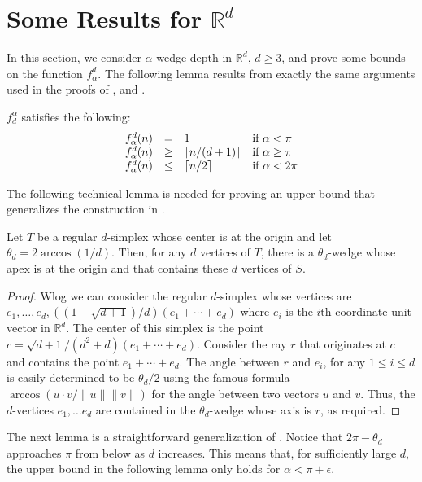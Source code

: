 \documentclass[lotsofwhite]{patmorin}
\newcommand{\blah}[1]{2\arccos(1/#1)}
\begin{document}
\section{Some Results for $\mathbb{R}^d$}

In this section, we consider $\alpha$-wedge depth in $\mathbb{R}^d$,
$d\ge 3$, and prove  some bounds on the function $f^d_\alpha$.  The
following lemma results from exactly the same arguments used in the
proofs of ,  and .

\begin{lem}
$f^\alpha_d$ satisfies the following:
\[\begin{array}{lcll}
  f^d_\alpha(n) & = & 1 & \mbox{if $\alpha < \pi$} \\
  f^d_\alpha(n) & \ge & \left\lceil n/(d+1) \right\rceil & \mbox{if $\alpha \ge \pi$} \\
  f^d_\alpha(n) & \le & \left\lceil n/2 \right\rceil & \mbox{if $\alpha < 2\pi$} \\
\end{array}\]
\end{lem}

The following technical lemma is needed for proving an upper bound
that generalizes the construction in .

\begin{lem}
Let $T$ be a regular $d$-simplex whose center is at the origin and let
$\theta_d=\blah{d}$.  Then, for any $d$ vertices of $T$, there is a
$\theta_d$-wedge whose apex is at the origin and that contains these
$d$ vertices of $S$.
\end{lem}

\begin{proof} 
Wlog we can consider the regular $d$-simplex whose vertices are
$e_1,\ldots,e_d, ((1-\sqrt{d+1})/d)(e_1+\cdots+e_d)$ where $e_i$ is the
$i$th coordinate unit vector in $\mathbb{R}^d$.  The center of this
simplex is the point $c=\sqrt{d+1}/(d^2+d)(e_1+\cdots+ e_d)$.
Consider the ray $r$ that originates at $c$ and
contains the point $e_1+\cdots+e_d$.  The angle between $r$ and
$e_i$, for any $1\le i\le d$ is easily determined to be
$\theta_d/2$ using the famous formula $\arccos (u\cdot
v/\|u\|\|v\|)$ for the angle between two vectors $u$ and $v$.   Thus,
the $d$-vertices $e_1,\ldots e_d$ are contained in the
$\theta_d$-wedge whose axis is $r$, as required.
\end{proof}

The next lemma is a straightforward generalization of .
Notice that $2\pi-\theta_d$ approaches $\pi$ from below as $d$ increases.
This means that, for sufficiently large $d$, the upper bound in the
following lemma only holds for $\alpha < \pi+\epsilon$.
\end{document}
